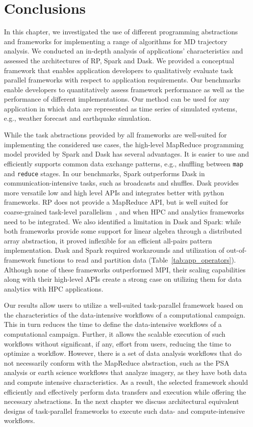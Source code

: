 \section{Conclusions}
\label{sec:tp_concl}

In this chapter, we investigated the use of different programming abstractions
and frameworks for implementing a range of algorithms for MD trajectory
analysis. We conducted an in-depth analysis of applications' characteristics and
assessed the architectures of RP, Spark and Dask. We provided a
conceptual framework that enables application developers to qualitatively
evaluate task parallel frameworks with respect to application requirements. Our
benchmarks enable developers to quantitatively assess framework performance as
well as the performance of different implementations. Our method can be used for
any application in which data are represented as time series of simulated
systems, e.g., weather forecast and earthquake simulation.

While the task abstractions provided by all frameworks are well-suited for
implementing the considered use cases, the high-level MapReduce programming
model provided by Spark and Dask has several advantages. It is easier to use and
efficiently supports common data exchange patterns, e.g., shuffling between
\texttt{map} and \texttt{reduce} stages. In our benchmarks, Spark outperforms
Dask in communication-intensive tasks, such as broadcasts and shuffles. Dask
provides more versatile low and high level APIs and integrates better with
python frameworks. RP does not provide a MapReduce API, but is well
suited for coarse-grained task-level parallelism~\cite{merzky2018design,
merzky2019using}, and when HPC and analytics frameworks need to be integrated.
We also identified a limitation in Dask and Spark: while both frameworks provide
some support for linear algebra through a distributed array abstraction, it
proved inflexible for an efficient all-pairs pattern implementation. Dask and
Spark required workarounds and utilization of out-of-framework functions to read
and partition data (Table~\ref{tab:app_operators}). Although none of these
frameworks outperformed MPI, their scaling capabilities along with their
high-level APIs create a strong case on utilizing them for data analytics with
HPC applications.

Our results allow users to utilize a well-suited task-parallel framework based
on the characteristics of the data-intensive workflows of a computational
campaign. This in turn reduces the time to define the data-intensive workflows
of a computational campaign. Further, it allows the scalable execution of such
workflows without significant, if any, effort from users, reducing the time to
optimize a workflow. However, there is a set of data analysis workflows that do
not necessarily conform with the MapReduce abstraction, such as the PSA analysis
or earth science workflows that analyze imagery, as they have both data and
compute intensive characteristics. As a result, the selected framework should
efficiently and effectively perform data transfers and execution while offering
the necessary abstractions. In the next chapter we discuss architectural
equivalent designs of task-parallel frameworks to execute such data- and
compute-intensive workflows.
